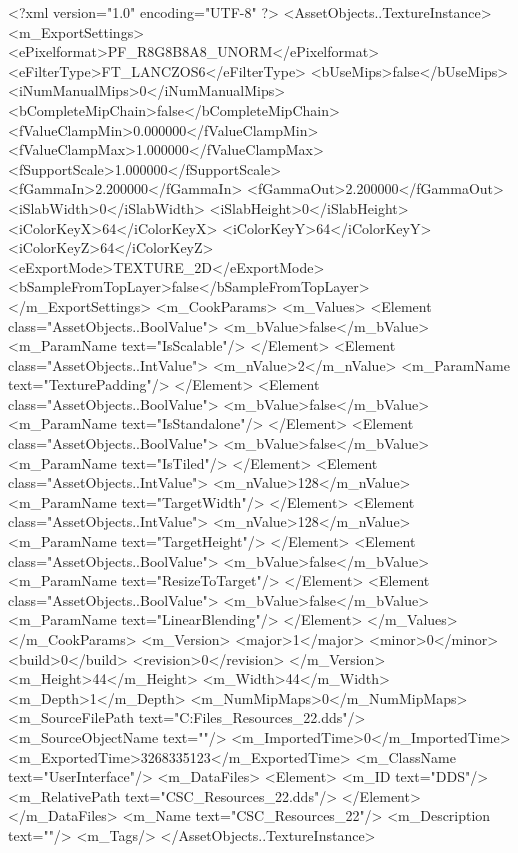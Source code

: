 <?xml version="1.0" encoding="UTF-8" ?>
<AssetObjects..TextureInstance>
	<m_ExportSettings>
		<ePixelformat>PF_R8G8B8A8_UNORM</ePixelformat>
		<eFilterType>FT_LANCZOS6</eFilterType>
		<bUseMips>false</bUseMips>
		<iNumManualMips>0</iNumManualMips>
		<bCompleteMipChain>false</bCompleteMipChain>
		<fValueClampMin>0.000000</fValueClampMin>
		<fValueClampMax>1.000000</fValueClampMax>
		<fSupportScale>1.000000</fSupportScale>
		<fGammaIn>2.200000</fGammaIn>
		<fGammaOut>2.200000</fGammaOut>
		<iSlabWidth>0</iSlabWidth>
		<iSlabHeight>0</iSlabHeight>
		<iColorKeyX>64</iColorKeyX>
		<iColorKeyY>64</iColorKeyY>
		<iColorKeyZ>64</iColorKeyZ>
		<eExportMode>TEXTURE_2D</eExportMode>
		<bSampleFromTopLayer>false</bSampleFromTopLayer>
	</m_ExportSettings>
	<m_CookParams>
		<m_Values>
			<Element class="AssetObjects..BoolValue">
				<m_bValue>false</m_bValue>
				<m_ParamName text="IsScalable"/>
			</Element>
			<Element class="AssetObjects..IntValue">
				<m_nValue>2</m_nValue>
				<m_ParamName text="TexturePadding"/>
			</Element>
			<Element class="AssetObjects..BoolValue">
				<m_bValue>false</m_bValue>
				<m_ParamName text="IsStandalone"/>
			</Element>
			<Element class="AssetObjects..BoolValue">
				<m_bValue>false</m_bValue>
				<m_ParamName text="IsTiled"/>
			</Element>
			<Element class="AssetObjects..IntValue">
				<m_nValue>128</m_nValue>
				<m_ParamName text="TargetWidth"/>
			</Element>
			<Element class="AssetObjects..IntValue">
				<m_nValue>128</m_nValue>
				<m_ParamName text="TargetHeight"/>
			</Element>
			<Element class="AssetObjects..BoolValue">
				<m_bValue>false</m_bValue>
				<m_ParamName text="ResizeToTarget"/>
			</Element>
			<Element class="AssetObjects..BoolValue">
				<m_bValue>false</m_bValue>
				<m_ParamName text="LinearBlending"/>
			</Element>
		</m_Values>
	</m_CookParams>
	<m_Version>
		<major>1</major>
		<minor>0</minor>
		<build>0</build>
		<revision>0</revision>
	</m_Version>
	<m_Height>44</m_Height>
	<m_Width>44</m_Width>
	<m_Depth>1</m_Depth>
	<m_NumMipMaps>0</m_NumMipMaps>
	<m_SourceFilePath text="C:\Users\Shadow\Desktop\Working Files\Icons\Resources\CSC_Resources_22.dds"/>
	<m_SourceObjectName text=""/>
	<m_ImportedTime>0</m_ImportedTime>
	<m_ExportedTime>3268335123</m_ExportedTime>
	<m_ClassName text="UserInterface"/>
	<m_DataFiles>
		<Element>
			<m_ID text="DDS"/>
			<m_RelativePath text="CSC_Resources_22.dds"/>
		</Element>
	</m_DataFiles>
	<m_Name text="CSC_Resources_22"/>
	<m_Description text=""/>
	<m_Tags/>
</AssetObjects..TextureInstance>

